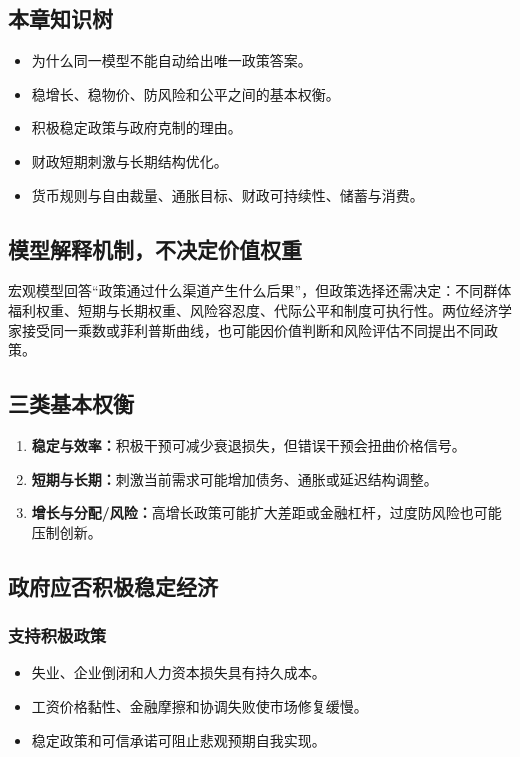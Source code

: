 \documentclass[UTF8,11pt,a4paper]{ctexart}
\newcommand{\term}[1]{\textbf{#1}}
\begin{document}
\subsection{本章知识树}
\begin{itemize}
  \item 为什么同一模型不能自动给出唯一政策答案。
  \item 稳增长、稳物价、防风险和公平之间的基本权衡。
  \item 积极稳定政策与政府克制的理由。
  \item 财政短期刺激与长期结构优化。
  \item 货币规则与自由裁量、通胀目标、财政可持续性、储蓄与消费。
\end{itemize}

\subsection{模型解释机制，不决定价值权重}
宏观模型回答“政策通过什么渠道产生什么后果”，但政策选择还需决定：不同群体福利权重、短期与长期权重、风险容忍度、代际公平和制度可执行性。两位经济学家接受同一乘数或菲利普斯曲线，也可能因价值判断和风险评估不同提出不同政策。

\subsection{三类基本权衡}
\begin{enumerate}
  \item \term{稳定与效率：}积极干预可减少衰退损失，但错误干预会扭曲价格信号。
  \item \term{短期与长期：}刺激当前需求可能增加债务、通胀或延迟结构调整。
  \item \term{增长与分配/风险：}高增长政策可能扩大差距或金融杠杆，过度防风险也可能压制创新。
\end{enumerate}

\subsection{政府应否积极稳定经济}
\subsubsection{支持积极政策}
\begin{itemize}
  \item 失业、企业倒闭和人力资本损失具有持久成本。
  \item 工资价格黏性、金融摩擦和协调失败使市场修复缓慢。
  \item 稳定政策和可信承诺可阻止悲观预期自我实现。
\end{itemize}
\end{document}
